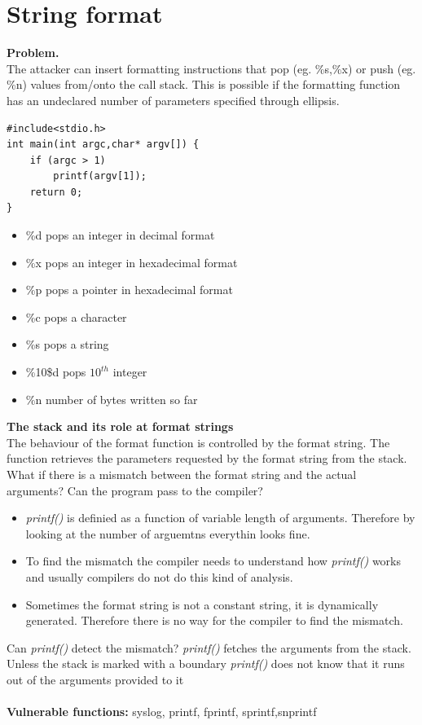 \documentclass[10pt,a4paper]{article}
\begin{document}
\section{String format}
\textbf{Problem.} \\
The attacker can insert formatting instructions that pop (eg. \%s,\%x) or push (eg. \%n) values from/onto the call stack. This is possible if the formatting function has an undeclared number of parameters specified through ellipsis.
\begin{verbatim}
#include<stdio.h>
int main(int argc,char* argv[]) {
	if (argc > 1)
		printf(argv[1]);
	return 0;
}
\end{verbatim}
\begin{itemize}
\item \%d pops an integer in decimal format
\item \%x pops an integer in hexadecimal format
\item \%p pops a pointer in hexadecimal format
\item \%c pops a character
\item \%s pops a string
\item \%10\$d pops $10^{th}$ integer
\item \%n number of bytes written so far
\end{itemize}
\textbf{The stack and its role at format strings}\\
The behaviour of the format function is controlled by the format string. The function retrieves the parameters requested by the format string from the stack. What if there is a mismatch between the format string and the actual arguments? Can the program pass to the compiler?
\begin{itemize}
\item \emph{printf()} is definied as a function of variable length of arguments. Therefore by looking at the number of arguemtns everythin looks fine.
\item To find the mismatch the compiler needs to understand how \emph{printf()} works and usually compilers do not do this kind of analysis.
\item Sometimes the format string is not a constant string, it is dynamically generated. Therefore there is no way for the compiler to find the mismatch.
\end{itemize}
Can \emph{printf()} detect the mismatch?
\emph{printf()} fetches the arguments from the stack. Unless the stack is marked with a boundary  \emph{printf()} does not know that it runs out of the arguments provided to it\\\\
\textbf{Vulnerable functions:} syslog, printf, fprintf, sprintf,snprintf
\end{document}
